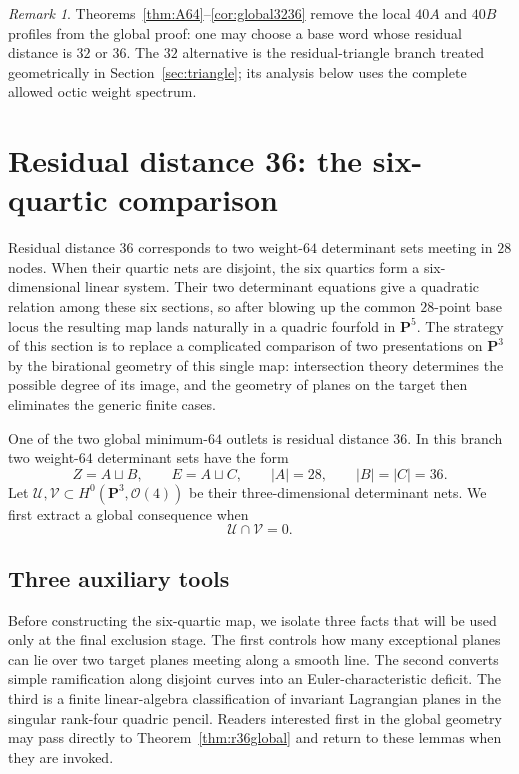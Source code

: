 \documentclass[11pt,reqno]{amsart}
\theoremstyle{remark}
\newtheorem{remark}[theorem]{Remark}
\newcommand{\PP}{\mathbf P}
\newcommand{\cO}{\mathcal O}
\begin{document}
\begin{remark}
Theorems~\ref{thm:A64}--\ref{cor:global3236} remove the local $40A$ and $40B$ profiles from the global proof: one may choose a base word whose residual distance is $32$ or $36$.  The $32$ alternative is the residual-triangle branch treated geometrically in Section~\ref{sec:triangle}; its analysis below uses the complete allowed octic weight spectrum.
\end{remark}

\section{Residual distance 36: the six-quartic comparison}\label{sec:comparison}
Residual distance $36$ corresponds to two weight-$64$ determinant sets meeting in $28$ nodes.  When their quartic nets are disjoint, the six quartics form a six-dimensional linear system.  Their two determinant equations give a quadratic relation among these six sections, so after blowing up the common $28$-point base locus the resulting map lands naturally in a quadric fourfold in $\PP^5$.  The strategy of this section is to replace a complicated comparison of two presentations on $\PP^3$ by the birational geometry of this single map: intersection theory determines the possible degree of its image, and the geometry of planes on the target then eliminates the generic finite cases.

One of the two global minimum-$64$ outlets is residual distance $36$.  In this branch two weight-$64$ determinant sets have the form
\[
Z=A\sqcup B,
\qquad
E=A\sqcup C,
\qquad
|A|=28,
\qquad
|B|=|C|=36.
\]
Let $\mathcal U,\mathcal V\subset H^0(\PP^3,\cO(4))$ be their three-dimensional determinant nets.  We first extract a global consequence when
\[
\mathcal U\cap\mathcal V=0.
\]

\subsection{Three auxiliary tools}
Before constructing the six-quartic map, we isolate three facts that will be used only at the final exclusion stage.  The first controls how many exceptional planes can lie over two target planes meeting along a smooth line.  The second converts simple ramification along disjoint curves into an Euler-characteristic deficit.  The third is a finite linear-algebra classification of invariant Lagrangian planes in the singular rank-four quadric pencil.  Readers interested first in the global geometry may pass directly to Theorem~\ref{thm:r36global} and return to these lemmas when they are invoked.
\end{document}
